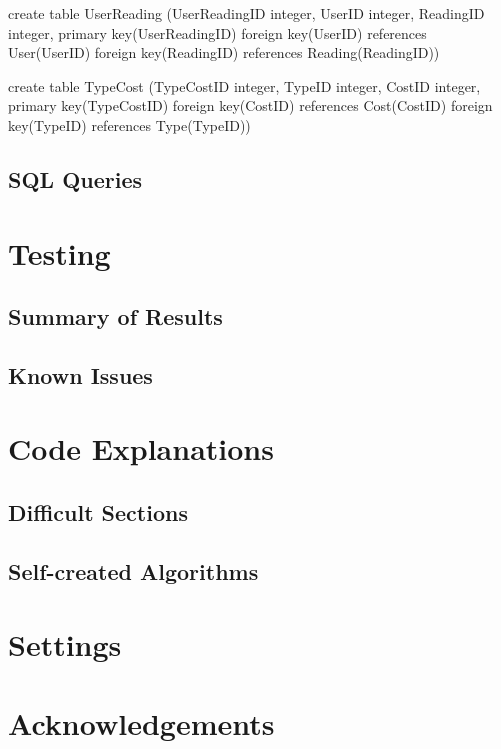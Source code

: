 \begin{sql}
create table UserReading
(UserReadingID integer,
UserID integer,
ReadingID integer,
primary key(UserReadingID)
foreign key(UserID) references User(UserID)
foreign key(ReadingID) references Reading(ReadingID))
\end{sql}

\begin{sql}
create table TypeCost
(TypeCostID integer,
TypeID integer,
CostID integer,
primary key(TypeCostID)
foreign key(CostID) references Cost(CostID)
foreign key(TypeID) references Type(TypeID))
\end{sql}

\subsection{SQL Queries}

\section{Testing}

\subsection{Summary of Results}

\subsection{Known Issues}

\section{Code Explanations}

\subsection{Difficult Sections}

\subsection{Self-created Algorithms}

\section{Settings}

\section{Acknowledgements}

